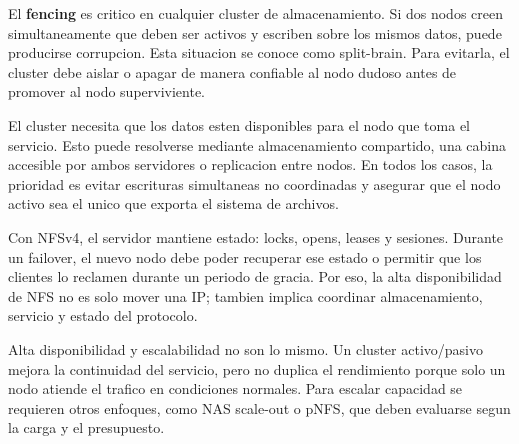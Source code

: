 El \textbf{fencing} es critico en cualquier cluster de almacenamiento. Si dos nodos creen simultaneamente que deben ser activos y escriben sobre los mismos datos, puede producirse corrupcion. Esta situacion se conoce como split-brain. Para evitarla, el cluster debe aislar o apagar de manera confiable al nodo dudoso antes de promover al nodo superviviente.

El cluster necesita que los datos esten disponibles para el nodo que toma el servicio. Esto puede resolverse mediante almacenamiento compartido, una cabina accesible por ambos servidores o replicacion entre nodos. En todos los casos, la prioridad es evitar escrituras simultaneas no coordinadas y asegurar que el nodo activo sea el unico que exporta el sistema de archivos.

Con NFSv4, el servidor mantiene estado: locks, opens, leases y sesiones. Durante un failover, el nuevo nodo debe poder recuperar ese estado o permitir que los clientes lo reclamen durante un periodo de gracia. Por eso, la alta disponibilidad de NFS no es solo mover una IP; tambien implica coordinar almacenamiento, servicio y estado del protocolo.

Alta disponibilidad y escalabilidad no son lo mismo. Un cluster activo/pasivo mejora la continuidad del servicio, pero no duplica el rendimiento porque solo un nodo atiende el trafico en condiciones normales. Para escalar capacidad se requieren otros enfoques, como NAS scale-out o pNFS, que deben evaluarse segun la carga y el presupuesto.
